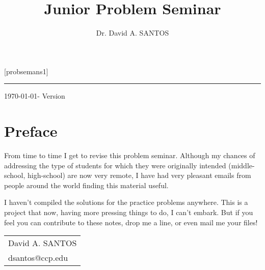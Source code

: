 \documentclass[11pt, openany]{book}
\makeatletter
\theoremstyle{change} \theoremheaderfont{\blue\sffamily\bfseries}
\theoremstyle{nonumberplain} \theoremheaderfont{\sffamily\bfseries}
\renewcommand{\maketitle}{\begin{titlepage}%
    \let\footnotesize\small
    \let\footnoterule\relax
    \parindent \z@
    \reset@font
    \null\vfil
    \begin{flushleft}
     \@title
    \end{flushleft}
    \par
    \hrule height 4pt
    \par
    \begin{flushright}
    \@author \par
    \end{flushright}
    \vskip 60\p@
    \vspace*{\stretch{2}}
    \begin{center}
\Large  \today - Version
    \end{center}
  \end{titlepage}%
  \setcounter{footnote}{0}%
}
\newcommand{\í}{\'{\i}}
\makeatother
\begin{document}
[probsemans1]

\title{\Large Junior Problem Seminar}
\author{Dr. David A. SANTOS}

\renewcommand{\headrulewidth}{1pt}
\renewcommand{\footrulewidth}{1pt}
\lhead{\nouppercase{\textcolor{blue}{\rightmark}}}
\rhead{\nouppercase{\textcolor{blue}{\leftmark}}}
\lhead[\rm\thepage]{\textcolor{blue}{\it \rightmark}} \rhead[\it
\textcolor{blue}{\leftmark}]{\rm\thepage} \cfoot{}
\thispagestyle{empty} \pagestyle{fancy}


\begin{frontmatter}
 \maketitle
\tableofcontents
 \end{frontmatter}

\chapter*{Preface}
\markboth{}{} 
 From time to time I get to revise this problem
seminar. Although my chances of addressing the type of students for
which they were originally intended (middle-school, high-school) are
now very remote, I have had very pleasant emails from people around
the world finding this material useful.

\bigskip

I haven't compiled the solutions for the practice problems anywhere.
This is a project that now, having more pressing things to do, I
can't embark. But if you feel you can contribute to these notes,
drop me a line, or even mail me your files!

\hfill \begin{tabular}{l}David A. SANTOS \\
{dsantos@ccp.edu}
\end{tabular}

\bigskip
\end{document}
